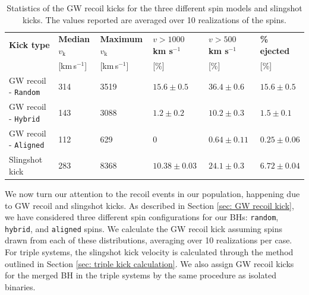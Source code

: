 \documentclass[twocolumn,linenumbers]{aastex701}
\newcommand{\kms}{km s$^{-1}$}
\begin{document}
\begin{table}
\centering
\hspace{-2cm}
\begin{tabular}{|l|l|l|l|l|l|}
\hline
\textbf{Kick type} & \textbf{Median $v_{\text{k}}$} & \textbf{Maximum $v_{\text{k}}$} & \textbf{ $ v > 1000$ \kms} & \textbf{ $v > 500$ \kms} & \textbf{\% ejected} \\ 
 & [km\,s$^{-1}$] & [km\,s$^{-1}$] & [\%] & [\%] & [\%] \\
\hline
GW recoil - \texttt{Random}            & 314                             & 3519                 & $15.6 \pm 0.5$                    & $36.4 \pm 0.6$                     & $15.6 \pm 0.5$                     \\ \hline
GW recoil - \texttt{Hybrid}             & 143                                & 3088                  & $1.2 \pm 0.2$                     & $10.2 \pm 0.3$                      & $1.5 \pm 0.1$                 \\ \hline
GW recoil - \texttt{Aligned}            & 112                                 & 629             & 0                     & $0.64 \pm 0.11$                      & $0.25 \pm 0.06$                      \\ \hline
Slingshot kick         &283                                 & 8368                  & $10.38 \pm 0.03$                    &   $24.1 \pm 0.3$                    & $6.72 \pm 0.04$                      \\ \hline
\end{tabular}

\caption{Statistics of the GW recoil kicks for the three different spin models and slingshot kicks. The values reported are averaged over 10 realizations of the spins.}
\label{table:recoil-statistics} 
\end{table}

We now turn our attention to the recoil events in our population, happening due to GW recoil and slingshot kicks. As described in Section \ref{sec: GW recoil kick}, we have considered three different spin configurations for our BHs: \texttt{random}, \texttt{hybrid}, and \texttt{aligned} spins. We calculate the GW recoil kick assuming spins drawn from each of these distributions, averaging over 10 realizations per case. For triple systems, the slingshot kick velocity is calculated through the method outlined in Section \ref{sec: triple kick calculation}. We also assign GW recoil kicks for the merged BH in the triple systems by the same procedure as isolated binaries. 
\end{document}
